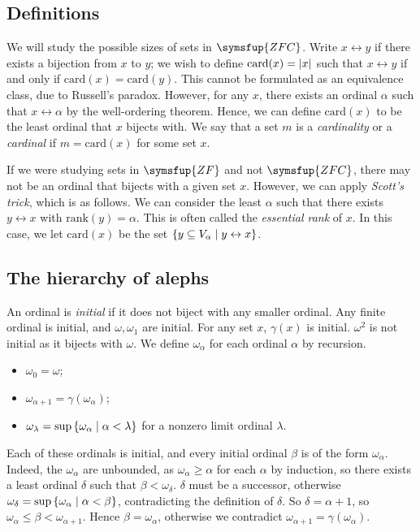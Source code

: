 \subsection{Definitions}
We will study the possible sizes of sets in \( \symsfup{ZFC} \).
Write \( x \leftrightarrow y \) if there exists a bijection from \( x \) to \( y \); we wish to define \( \mathrm{card}(x) = \abs{x} \) such that \( x \leftrightarrow y \) if and only if \( \mathrm{card}(x) = \mathrm{card}(y) \).
This cannot be formulated as an equivalence class, due to Russell's paradox.
However, for any \( x \), there exists an ordinal \( \alpha \) such that \( x \leftrightarrow \alpha \) by the well-ordering theorem.
Hence, we can define \( \mathrm{card}(x) \) to be the least ordinal that \( x \) bijects with.
We say that a set \( m \) is a \emph{cardinality} or a \emph{cardinal} if \( m = \mathrm{card}(x) \) for some set \( x \).

If we were studying sets in \( \symsfup{ZF} \) and not \( \symsfup{ZFC} \), there may not be an ordinal that bijects with a given set \( x \).
However, we can apply \emph{Scott's trick}, which is as follows.
We can consider the least \( \alpha \) such that there exists \( y \leftrightarrow x \) with \( \mathrm{rank}(y) = \alpha \).
This is often called the \emph{essential rank} of \( x \).
In this case, we let \( \mathrm{card}(x) \) be the set \( \qty{y \subseteq V_\alpha \mid y \leftrightarrow x} \).

\subsection{The hierarchy of alephs}
An ordinal is \emph{initial} if it does not biject with any smaller ordinal.
Any finite ordinal is initial, and \( \omega, \omega_1 \) are initial.
For any set \( x \), \( \gamma(x) \) is initial.
\( \omega^2 \) is not initial as it bijects with \( \omega \).
We define \( \omega_\alpha \) for each ordinal \( \alpha \) by recursion.
\begin{itemize}
    \item \( \omega_0 = \omega \);
    \item \( \omega_{\alpha + 1} = \gamma(\omega_\alpha) \);
    \item \( \omega_\lambda = \sup\qty{\omega_\alpha \mid \alpha < \lambda} \) for a nonzero limit ordinal \( \lambda \).
\end{itemize}
Each of these ordinals is initial, and every initial ordinal \( \beta \) is of the form \( \omega_\alpha \).
Indeed, the \( \omega_\alpha \) are unbounded, as \( \omega_\alpha \geq \alpha \) for each \( \alpha \) by induction, so there exists a least ordinal \( \delta \) such that \( \beta < \omega_\delta \).
\( \delta \) must be a successor, otherwise \( \omega_\delta = \sup\qty{\omega_\alpha \mid \alpha < \beta} \), contradicting the definition of \( \delta \).
So \( \delta = \alpha + 1 \), so \( \omega_\alpha \leq \beta < \omega_{\alpha+1} \).
Hence \( \beta = \omega_\alpha \), otherwise we contradict \( \omega_{\alpha+1} = \gamma(\omega_\alpha) \).

